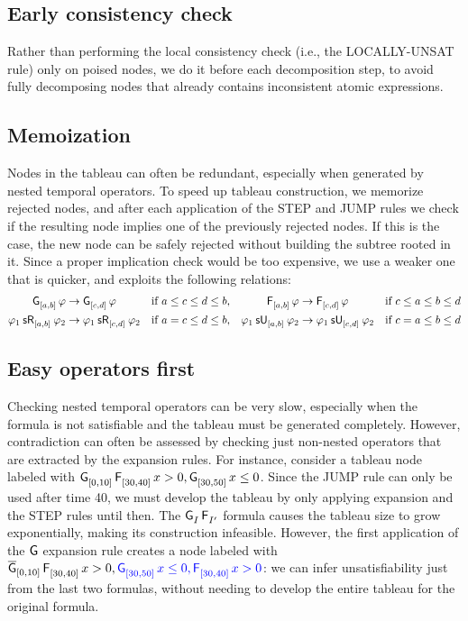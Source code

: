 \documentclass[acmsmall,screen]{acmart}
\begin{document}
\subsection{Early consistency check}
\label{sec:early-consistency-check}
Rather than performing the local consistency check (i.e., the \textsf{LOCALLY-UNSAT} rule)
only on poised nodes, we do it before each decomposition step, to avoid fully decomposing nodes that already contains inconsistent atomic expressions.

\subsection{Memoization}
\label{sec:memo}
Nodes in the tableau can often be redundant, especially when generated by nested temporal operators.
To speed up tableau construction, we memorize rejected nodes,
and after each application of the \textsf{STEP} and \textsf{JUMP} rules we check if the resulting node
implies one of the previously rejected nodes.
If this is the case, the new node can be safely rejected without building the subtree rooted in it.
Since a proper implication check would be too expensive, we use a weaker one that is quicker,
and exploits the following relations:
\begin{align*}
\glob{[a,b]} \varphi &\implies \glob{[c,d]} \varphi && \text{if } a \leq c \leq d \leq b,
&
\even{[a,b]} \varphi &\implies \even{[c,d]} \varphi && \text{if } c \leq a \leq b \leq d \\
\srelease{[a,b]}{\varphi_1}{\varphi_2} &\implies \srelease{[c,d]}{\varphi_1}{\varphi_2} && \text{if } a = c \leq d \leq b,
&
\suntil{[a,b]}{\varphi_1}{\varphi_2} &\implies \suntil{[c,d]}{\varphi_1}{\varphi_2} && \text{if } c = a \leq b \leq d
\end{align*}

\subsection{Easy operators first}
\label{sec:easy-first}

Checking nested temporal operators can be very slow, especially when the formula is not satisfiable and the tableau must be generated completely.
However, contradiction can often be assessed by checking just non-nested operators that are extracted by the expansion rules.
For instance, consider a tableau node labeled with $\glob{[0,10]} \even{[30,40]} x > 0, \glob{[30,50]} x \leq 0$.
Since the \textsf{JUMP} rule can only be used after time 40,
we must develop the tableau by only applying expansion and the \textsf{STEP} rules until then.
The $\glob{I} \even{I'}$ formula causes the tableau size to grow exponentially,
making its construction infeasible.
However, the first application of the $\globop$ expansion rule creates a node labeled with
$\mglob{[0,10]} \even{[30,40]} x > 0, \textcolor{blue}{\glob{[30,50]} x \leq 0, \even{[30,40]} x > 0}$:
we can infer unsatisfiability just from the last two formulas,
without needing to develop the entire tableau for the original formula.
\end{document}
